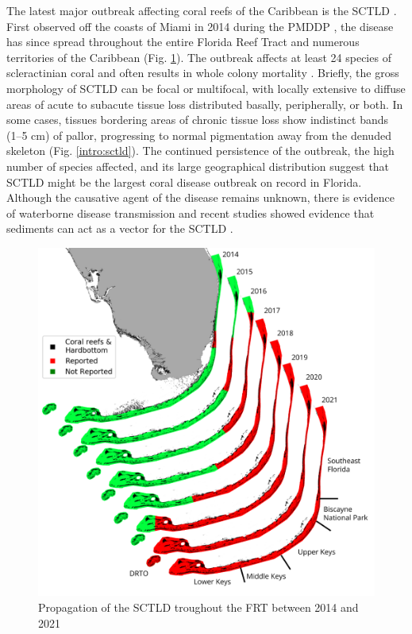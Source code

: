 The latest major outbreak affecting coral reefs of the Caribbean is the SCTLD \citep{noaa2018}. First observed off the coasts of Miami in 2014 during the PMDDP \citep{precht2016unprecedented}, the disease has since spread throughout the entire Florida Reef Tract and numerous territories of the Caribbean \citep{alvarez2019rapid, kramer2019map, estrada2021effects} (Fig. \ref{intro:propagation}). The outbreak affects at least 24 species of scleractinian coral and often results in whole colony mortality \citep{precht2016unprecedented, walton2018impacts}. Briefly, the gross morphology of SCTLD can be focal or multifocal, with locally extensive to diffuse areas of acute to subacute tissue loss distributed basally, peripherally, or both. In some cases, tissues bordering areas of chronic tissue loss show indistinct bands (1–5 cm) of pallor, progressing to normal pigmentation away from the denuded skeleton (Fig. \ref{intro:sctld}). The continued persistence of the outbreak, the high number of species affected, and its large geographical distribution suggest that SCTLD might be the largest coral disease outbreak on record in Florida. Although the causative agent of the disease remains unknown, there is evidence of waterborne disease transmission \citep{aeby2019pathogenesis,eaton2021measuring,meiling2021variable} and recent studies showed evidence that sediments can act as a vector for the SCTLD \citep{rosales2020rhodobacterales, studivan2022reef}. 

\begin{figure}
    \centering
    \includegraphics[width=\textwidth]{chapters/intro/figures/fig_sctld.png}
    \caption{Propagation of the SCTLD troughout the FRT between 2014 and 2021}
    \label{intro:propagation}
\end{figure}

